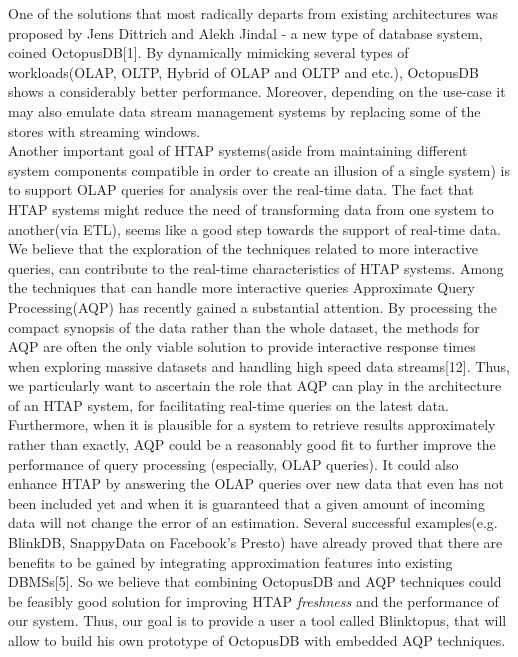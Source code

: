 \documentclass[10pt, conference, compsocconf]{IEEEtran}
\begin{document}
One of the solutions that most radically departs from existing architectures was proposed by Jens Dittrich and Alekh Jindal - a new type of database system, coined OctopusDB[1]. By dynamically mimicking several types of workloads(OLAP, OLTP, Hybrid of OLAP and OLTP and etc.), OctopusDB shows a considerably better performance. Moreover, depending on the use-case it may also emulate data stream management systems by replacing some of the stores with streaming windows. \\ Another important goal of HTAP systems(aside from maintaining different system components compatible in order to create an illusion of a single system) is to support OLAP queries for analysis over the real-time data. The fact that HTAP systems might reduce the need of transforming data from one system to another(via ETL), seems like a good step towards the support of real-time data. We believe that the exploration of the techniques related to more interactive queries, can contribute to the real-time characteristics of HTAP systems. Among the techniques that can handle more interactive queries Approximate Query Processing(AQP) has recently gained a substantial attention. By processing the compact synopsis of the data rather than the whole dataset, the methods for AQP are often the only viable solution to provide interactive response times when exploring massive datasets and handling high speed data streams[12]. Thus, we particularly want to ascertain the role that AQP can play in the architecture of an HTAP system, for facilitating real-time queries on the latest data. %
Furthermore, when it is plausible for a system to retrieve results approximately rather than exactly, AQP could be a reasonably good fit to further improve the performance of query processing (especially, OLAP queries). It could also enhance HTAP by answering the OLAP queries over new data that even has not been included yet and when it is guaranteed that a given amount of incoming data will not change the error of an estimation. Several successful examples(e.g. BlinkDB, SnappyData on Facebook's Presto) have already proved that there are benefits to be gained by integrating approximation features into existing DBMSs[5]. So we believe that combining OctopusDB and AQP techniques could be feasibly good solution for improving HTAP \textit{freshness} and the performance of our system. 
Thus, our goal is to provide a user a tool called Blinktopus, that will allow  to build his own prototype of OctopusDB with embedded AQP techniques.
\end{document}
